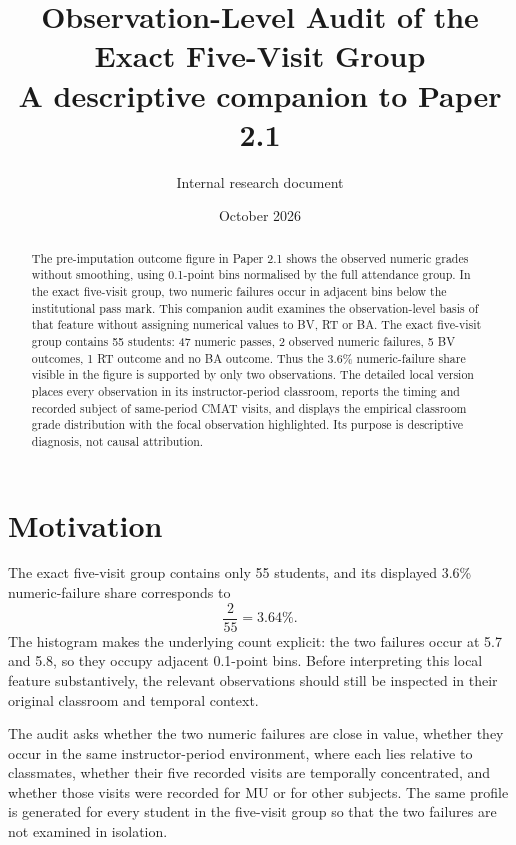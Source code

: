 \documentclass[11pt]{article}
\title{\textbf{Observation-Level Audit of the Exact Five-Visit Group}\\
\large A descriptive companion to Paper 2.1}
\author{Internal research document}
\date{October 2026}
\begin{document}
\maketitle

\begin{abstract}
The pre-imputation outcome figure in Paper 2.1 shows the observed numeric grades without smoothing, using 0.1-point bins normalised by the full attendance group. In the exact five-visit group, two numeric failures occur in adjacent bins below the institutional pass mark. This companion audit examines the observation-level basis of that feature without assigning numerical values to BV, RT or BA. The exact five-visit group contains 55 students: 47 numeric passes, 2 observed numeric failures, 5 BV outcomes, 1 RT outcome and no BA outcome. Thus the 3.6\% numeric-failure share visible in the figure is supported by only two observations. The detailed local version places every observation in its instructor-period classroom, reports the timing and recorded subject of same-period CMAT visits, and displays the empirical classroom grade distribution with the focal observation highlighted. Its purpose is descriptive diagnosis, not causal attribution.
\end{abstract}

\section{Motivation}
The exact five-visit group contains only 55 students, and its displayed 3.6\% numeric-failure share corresponds to
\[
\frac{2}{55}=3.64\%.
\]
The histogram makes the underlying count explicit: the two failures occur at 5.7 and 5.8, so they occupy adjacent 0.1-point bins. Before interpreting this local feature substantively, the relevant observations should still be inspected in their original classroom and temporal context.

The audit asks whether the two numeric failures are close in value, whether they occur in the same instructor-period environment, where each lies relative to classmates, whether their five recorded visits are temporally concentrated, and whether those visits were recorded for MU or for other subjects. The same profile is generated for every student in the five-visit group so that the two failures are not examined in isolation.
\end{document}
